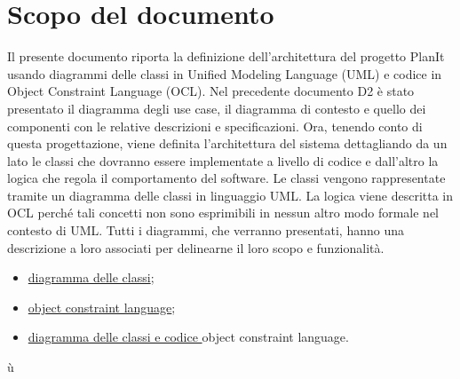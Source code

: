 \section*{Scopo del documento}
Il presente documento riporta la definizione dell’architettura del progetto PlanIt usando diagrammi delle classi in Unified Modeling Language (UML) e codice in Object Constraint Language (OCL). Nel precedente documento D2 è stato presentato il diagramma degli use case, il diagramma di contesto e quello dei componenti con le relative descrizioni e specificazioni. Ora, tenendo conto di questa progettazione, viene definita l’architettura del sistema dettagliando da un lato le classi che dovranno essere implementate a livello di codice e dall’altro la logica che regola il comportamento del software. Le classi vengono rappresentate tramite un diagramma delle classi in linguaggio UML. La logica viene descritta in OCL perché tali concetti non sono esprimibili in nessun altro modo formale nel contesto di UML. Tutti i diagrammi, che verranno presentati, hanno una descrizione a loro associati per delinearne il loro scopo e funzionalità.

\begin{itemize}
    \item \hyperref[secD3:DiagrammaDelleClassi]{diagramma delle classi};
    \item \hyperref[secD3:ObjectConstraintLanguage]{object constraint language};
    \item \hyperref[secD3:DiagrammaECodiceObjectConstraintLanguage]{diagramma delle classi e codice }object constraint language.
\end{itemize}ù


